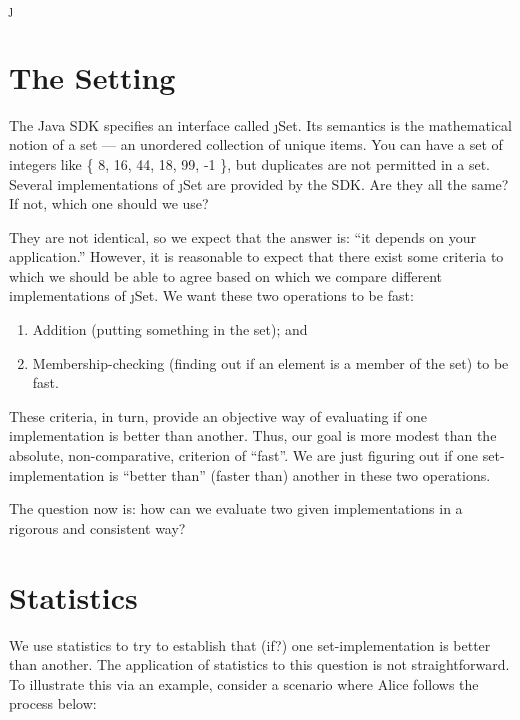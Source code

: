 
\DeclareUrlCommand\j{}




\section*{The Setting}\label{sec:setting}
The Java SDK \cite{java:set} specifies an interface called \j{Set}. Its semantics
is the mathematical notion of a set --- an unordered collection of unique items. You can have a set of integers like \{ 8, 16, 44, 18, 99, -1 \}, but duplicates are not permitted in a set.
Several implementations of \j{Set} are provided by the SDK. Are they all the same? If not, which one should we use?

They are not identical, so we expect that the answer is: ``it depends on your application.'' However, it is reasonable to expect that there exist some criteria to which we should
be able to agree based on which we compare different implementations of \j{Set}.
We want these two operations to be fast:
\begin{enumerate}
    \item Addition (putting something in the set); and
    \item Membership-checking (finding out if an element is a member of the set) to be fast.
\end{enumerate}

These criteria, in turn, provide an objective way of evaluating if
one implementation is better than another. Thus, our goal is
more modest than the absolute, non-comparative, criterion of ``fast''. 
We are just figuring out if one set-implementation
is ``better than'' (faster than) another in these two operations.

The question now is: how can we evaluate two given implementations in a rigorous and consistent way?

\section*{Statistics} \label{sec:statistics}

We use statistics to try to establish that (if?) one set-implementation
is better than another. The application of statistics 
to this question is not straightforward. To illustrate this via
an example, consider a scenario where Alice follows the process below:

